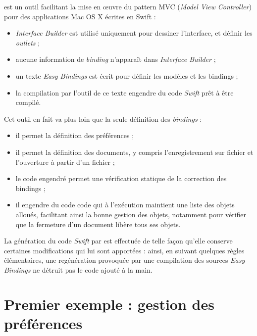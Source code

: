  est un outil facilitant la mise en œuvre du pattern MVC (\emph{Model View Controller}) pour des applications Mac OS X écrites en Swift :
\begin{itemize}
  \item \emph{Interface Builder} est utilisé uniquement pour dessiner l'interface, et définir les \emph{outlets} ;
  \item aucune information de \emph{binding} n'apparaît dans \emph{Interface Builder} ;
  \item un texte \emph{Easy Bindings} est écrit pour définir les modèles et les bindings ;
  \item la compilation par l'outil  de ce texte engendre du code \emph{Swift} prêt à être compilé.
\end{itemize}

Cet outil en fait va plus loin que la seule définition des \emph{bindings} :
\begin{itemize}
 \item il permet la définition des préférences ;
 \item il permet la définition des documents, y compris l'enregistrement sur fichier et l'ouverture à partir d'un fichier ;
 \item le code engendré permet une vérification statique de la correction des bindings ;
 \item il engendre du code code qui à l'exécution maintient une liste des objets alloués, facilitant ainsi la bonne gestion des objets, notamment pour vérifier que la fermeture d'un document libère tous ses objets.
\end{itemize}

La génération du code \emph{Swift} par  est effectuée de telle façon qu'elle conserve certaines modifications qui lui sont apportées : ainsi, en suivant quelques règles élémentaires, une regénération provoquée par une compilation des sources \emph{Easy Bindings} ne détruit pas le code ajouté à la main.

\section{Premier exemple : gestion des préférences}


